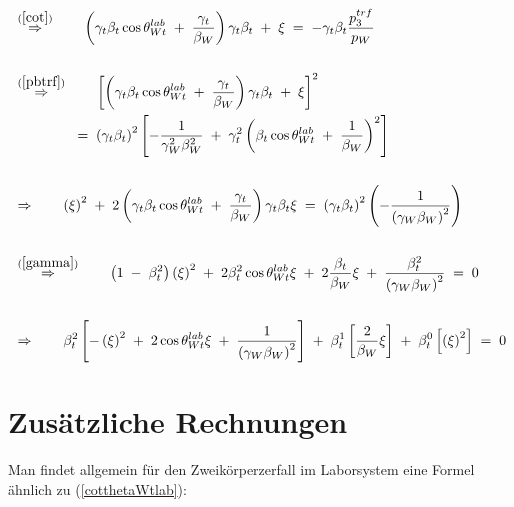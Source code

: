 \documentclass[
a4paper,                                %
twoside,                                %
BCOR1.4cm,                      %
ngerman,                                %
10pt,                           %
headings=normal,                %
headsepline,                    %
clearplainpage, %
final,                                  %
div=14,
parskip=full
]{scrbook}
\begin{document}
\begin{align}
&\stackrel{\mathrm{(\ref{cot})}}\Rightarrow\qquad
	\left(\gamma_{t} \beta_{t} \cos \theta_{Wt}^{lab}
	\;+\;\dfrac{\gamma_{t}}{\beta_{W}}\right)
	\gamma_{t} \beta_{t}\;+\;\xi
\;=\;
	-\gamma_{t} \beta_{t} \dfrac{p_{3}^{trf}}{p_{W}}
\nonumber
\\
\nonumber
\\
&\stackrel{\mathrm{(\ref{pbtrf})}}\Rightarrow\qquad
	\left[ \left(\gamma_{t} \beta_{t} \cos \theta_{Wt}^{lab}
	\;+\;\dfrac{\gamma_{t}}{\beta_{W}}\right)
	\gamma_{t} \beta_{t}\;+\;\xi \right]^{2}
\nonumber
\\
&\qquad\qquad\;=\;
	\left(\gamma_{t} \beta_{t}\right)^{2} \left[
		-\dfrac{1}{\gamma_{W}^{2} \beta_{W}^{2}}
		\;+\;\gamma_{t}^{2} \left(
			\beta_{t} \cos \theta_{Wt}^{lab}
			\;+\;\dfrac{1}{\beta_{W}} 
		\right)^{2}
	\right]
\nonumber
\\
\nonumber
\\
&\Rightarrow\qquad
	\left(\xi\right)^{2}\;+\;
	2 \left(\gamma_{t} \beta_{t} \cos \theta_{Wt}^{lab}\;+\;
	\dfrac{\gamma_{t}}{\beta_{W}}\right) \gamma_{t} \beta_{t} \xi
\;=\;
	\left(\gamma_{t} \beta_{t}\right)^{2} 
	\left(-\dfrac{1}{\left(\gamma_{W} \beta_{W}\right)^{2}}\right)
\nonumber
\\
\nonumber
\\
&\stackrel{\mathrm{(\ref{gamma})}}\Rightarrow\qquad
	\left(1\;-\;\beta_{t}^{2}\right) \left(\xi\right)^{2}
	\;+\;2 \beta_{t}^{2} \cos \theta_{Wt}^{lab} \xi
	\;+\;2 \dfrac{\beta_{t}}{\beta_{W}} \xi
	\;+\;\dfrac{\beta_{t}^{2}}{\left(\gamma_{W} \beta_{W}\right)^{2}}
\;=\;0
\nonumber
\\
\nonumber
\\
&\Rightarrow\qquad
	\beta_{t}^{2} \left[
		-\left(\xi\right)^{2}\;+\;2 \cos \theta_{Wt}^{lab} \xi
		\;+\;\dfrac{1}{\left(\gamma_{W} \beta_{W}\right)^{2}}
	\right]
	\;+\;\beta_{t}^{1} \left[\dfrac{2}{\beta_{W}} \xi \right]
	\;+\;\beta_{t}^{0} \left[\left(\xi\right)^{2} \right]
\;=\;0
\end{align}

\newpage

\section{Zus\"atzliche Rechnungen}

Man findet allgemein f\"ur den Zweik\"orperzerfall im Laborsystem eine Formel \"ahnlich zu (\ref{cotthetaWtlab}):
\end{document}
